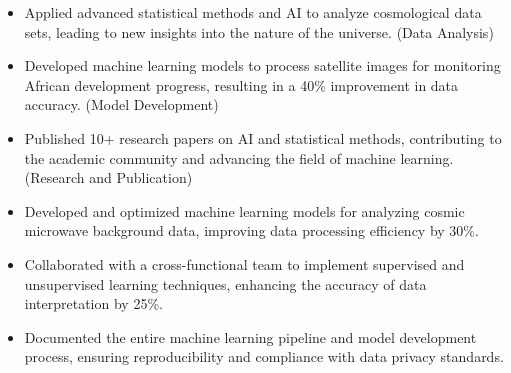 \documentclass{minimal}
\begin{document}
\begin{adjustwidth}{2em}{0em}
\begin{itemize}
\end{itemize}
\vspace{0.5em}
\begin{flushleft}{}\end{flushleft}
\begin{itemize}
    \item Applied advanced statistical methods and AI to analyze cosmological data sets, leading to new insights into the nature of the universe. (Data Analysis)
\end{itemize}
\begin{itemize}
    \item Developed machine learning models to process satellite images for monitoring African development progress, resulting in a 40\% improvement in data accuracy. (Model Development)
\end{itemize}
\begin{itemize}
    \item Published 10+ research papers on AI and statistical methods, contributing to the academic community and advancing the field of machine learning. (Research and Publication)
\end{itemize}
\vspace{0.5em}
\end{adjustwidth}

\begin{adjustwidth}{2em}{0em}
\end{adjustwidth}

\vspace{1em}


\begin{adjustwidth}{2em}{0em}
\begin{itemize}
        \item Developed and optimized machine learning models for analyzing cosmic microwave background data, improving data processing efficiency by 30\%.
        \item Collaborated with a cross{-}functional team to implement supervised and unsupervised learning techniques, enhancing the accuracy of data interpretation by 25\%.
        \item Documented the entire machine learning pipeline and model development process, ensuring reproducibility and compliance with data privacy standards.
    \end{itemize}
\end{adjustwidth}
\vspace{1em}
\end{document}
